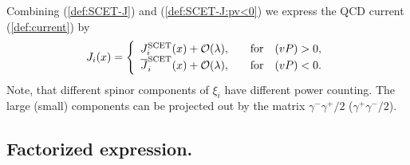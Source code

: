 \documentclass[a4paper, amsfonts, amssymb, amsmath, reprint, showkeys, nofootinbib, twoside]{revtex4-1}
\renewcommand{\(}{\left(}
\renewcommand{\)}{\right)}
\renewcommand{\[}{\left[}
\renewcommand{\]}{\right]}
\begin{document}
Combining (\ref{def:SCET-J}) and (\ref{def:SCET-J:pv<0}) we express the QCD current (\ref{def:current}) by
\begin{eqnarray}\label{J-to-SCET}
J_i(x)=\left\{\begin{array}{cc}
J_i^{\text{SCET}}(x)+\mathcal{O}(\lambda), & ~~~{\rm for}~~~(vP)>0,
\\
\overline{J}_i^{\text{SCET}}(x)+\mathcal{O}(\lambda), & ~~~{\rm for}~~~(vP)<0.
\end{array}\right.
\end{eqnarray}
Note, that different spinor components of $\xi_i$ have different power counting. The large (small) components can be projected out by the matrix $\gamma^-\gamma^+/2$ ($\gamma^+\gamma^-/2$).



\subsection{Factorized expression.}
\end{document}
